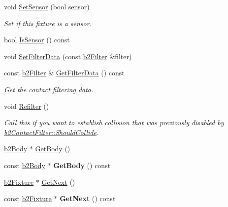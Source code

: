 \begin{DoxyCompactItemize}
void \hyperlink{classb2Fixture_a6198a81dcee0fe814d730383ebfa7038}{Set\+Sensor} (bool sensor)
\begin{DoxyCompactList}\small\item\em Set if this fixture is a sensor. \end{DoxyCompactList}\item 
bool \hyperlink{classb2Fixture_aedd23d27ff7ce2d53b6c5b7a878a35d3}{Is\+Sensor} () const
\item 
void \hyperlink{classb2Fixture_a2c5e0d12c174927a4ad550459be334ad}{Set\+Filter\+Data} (const \hyperlink{structb2Filter}{b2\+Filter} \&filter)
\item 
\mbox{\label{classb2Fixture_a07e708a6fbc8429a2aa0bf5c8aabcaba}} 
const \hyperlink{structb2Filter}{b2\+Filter} \& \hyperlink{classb2Fixture_a07e708a6fbc8429a2aa0bf5c8aabcaba}{Get\+Filter\+Data} () const
\begin{DoxyCompactList}\small\item\em Get the contact filtering data. \end{DoxyCompactList}\item 
\mbox{\label{classb2Fixture_a45d3320f94811d67383c48466165fa26}} 
void \hyperlink{classb2Fixture_a45d3320f94811d67383c48466165fa26}{Refilter} ()
\begin{DoxyCompactList}\small\item\em Call this if you want to establish collision that was previously disabled by \hyperlink{classb2ContactFilter_aac8f6155d1f577d125db587f5269289b}{b2\+Contact\+Filter\+::\+Should\+Collide}. \end{DoxyCompactList}\item 
\hyperlink{classb2Body}{b2\+Body} $\ast$ \hyperlink{classb2Fixture_a6f7881f21a9c401542b2fceeb1c1ed1c}{Get\+Body} ()
\item 
\mbox{\label{classb2Fixture_a43009e5d38cd9853f1539cd1c39f0e98}} 
const \hyperlink{classb2Body}{b2\+Body} $\ast$ {\bfseries Get\+Body} () const
\item 
\hyperlink{classb2Fixture}{b2\+Fixture} $\ast$ \hyperlink{classb2Fixture_accaec7901fa27f08ec0427a6095dba09}{Get\+Next} ()
\item 
\mbox{\label{classb2Fixture_a1c1ec15bdbc4e8efc1892b6bbf6c4ebf}} 
const \hyperlink{classb2Fixture}{b2\+Fixture} $\ast$ {\bfseries Get\+Next} () const

\end{DoxyCompactItemize}
